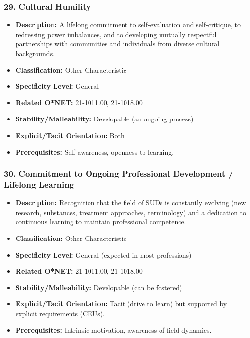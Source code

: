 \documentclass[
  letterpaper,
  DIV=11,
  numbers=noendperiod]{scrartcl}
\providecommand{\tightlist}{%
  \setlength{\itemsep}{0pt}\setlength{\parskip}{0pt}}
\begin{document}
\subsubsection{29. Cultural Humility}\label{cultural-humility}

\begin{itemize}
\tightlist
\item
  \textbf{Description:} A lifelong commitment to self-evaluation and
  self-critique, to redressing power imbalances, and to developing
  mutually respectful partnerships with communities and individuals from
  diverse cultural backgrounds.
\item
  \textbf{Classification:} Other Characteristic
\item
  \textbf{Specificity Level:} General
\item
  \textbf{Related O*NET:} 21-1011.00, 21-1018.00
\item
  \textbf{Stability/Malleability:} Developable (an ongoing process)
\item
  \textbf{Explicit/Tacit Orientation:} Both
\item
  \textbf{Prerequisites:} Self-awareness, openness to learning.
\end{itemize}

\subsubsection{30. Commitment to Ongoing Professional Development /
Lifelong
Learning}\label{commitment-to-ongoing-professional-development-lifelong-learning}

\begin{itemize}
\tightlist
\item
  \textbf{Description:} Recognition that the field of SUDs is constantly
  evolving (new research, substances, treatment approaches, terminology)
  and a dedication to continuous learning to maintain professional
  competence.
\item
  \textbf{Classification:} Other Characteristic
\item
  \textbf{Specificity Level:} General (expected in most professions)
\item
  \textbf{Related O*NET:} 21-1011.00, 21-1018.00
\item
  \textbf{Stability/Malleability:} Developable (can be fostered)
\item
  \textbf{Explicit/Tacit Orientation:} Tacit (drive to learn) but
  supported by explicit requirements (CEUs).
\item
  \textbf{Prerequisites:} Intrinsic motivation, awareness of field
  dynamics.
\end{itemize}
\end{document}
